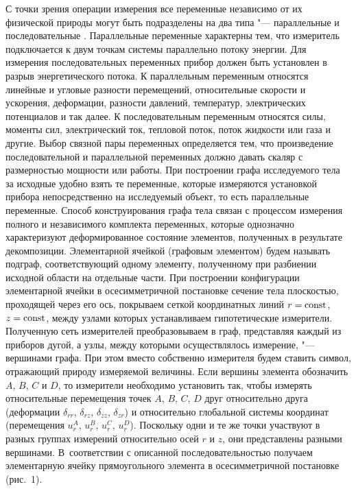С точки зрения операции измерения все переменные независимо от их
физической природы могут быть подразделены на два типа "---
параллельные и последовательные \cite{tyr:bib:5}. Параллельные переменные
характерны тем, что измеритель подключается к двум точкам системы
параллельно потоку энергии. Для измерения последовательных
переменных прибор должен быть установлен в разрыв энергетического
потока. К параллельным переменным относятся линейные и угловые
разности перемещений, относительные скорости и ускорения,
деформации, разности давлений, температур, электрических
потенциалов и так далее. К последовательным переменным относятся
силы, моменты сил, электрический ток, тепловой поток, поток
жидкости или газа и другие. Выбор связной пары переменных
определяется тем, что произведение последовательной и параллельной
переменных должно давать скаляр с размерностью мощности или
работы. При построении графа исследуемого тела за исходные удобно
взять те переменные, которые измеряются установкой прибора
непосредственно на исследуемый объект, то есть параллельные
переменные. Способ конструирования графа тела связан с процессом
измерения полного и независимого комплекта переменных, которые
однозначно характеризуют деформированное состояние элементов,
полученных в результате декомпозиции. Элементарной ячейкой
(графовым элементом) будем называть подграф, соответствующий
одному элементу, полученному при разбиении исходной области на
отдельные части. При построении конфигурации элементарной ячейки в
осесимметричной постановке сечение тела плоскостью, проходящей
через его ось, покрываем сеткой координатных линий $r={\rm const}$, 
$z={\rm const}$, между узлами которых устанавливаем гипотетические
измерители. Полученную сеть измерителей преобразовываем в граф,
представляя каждый из приборов дугой, а узлы, между которыми
осуществлялось измерение, "--- вершинами графа. При этом вместо
собственно измерителя будем ставить символ, отражающий природу
измеряемой величины. Если вершины элемента обозначить $A$, $B$, $C$  и
$D$, то измерители необходимо установить так, чтобы измерять
относительные перемещения точек $A$, $B$, $C$, $D $ друг относительно
друга (деформации $\delta_{rr}$, $\delta_{rz}$, $\delta_{zz}$, $\delta_{zr}$) и относительно
глобальной  системы координат (перемещения
$u_r^A$, $u_r^B$, $u_r^C$, $u_r^D$). 
Поскольку одни и те же точки участвуют в разных группах измерений относительно осей $r$  и
$z$, они представлены разными вершинами. 
В~соответствии с описанной последовательностью получаем элементарную
ячейку прямоугольного элемента в осесимметричной постановке (рис.~1). 

